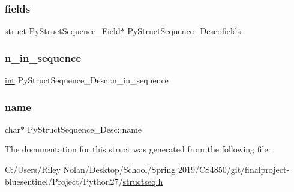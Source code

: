 \subsubsection{\texorpdfstring{fields}{fields}}
{\footnotesize\ttfamily struct \mbox{\hyperlink{struct_py_struct_sequence___field}{Py\+Struct\+Sequence\+\_\+\+Field}}$\ast$ Py\+Struct\+Sequence\+\_\+\+Desc\+::fields}

\mbox{\label{struct_py_struct_sequence___desc_a8a294c7934e6ac8ee4ad5cf0d1496d28}} 
\subsubsection{\texorpdfstring{n\_in\_sequence}{n\_in\_sequence}}
{\footnotesize\ttfamily \mbox{\hyperlink{warnings_8h_a74f207b5aa4ba51c3a2ad59b219a423b}{int}} Py\+Struct\+Sequence\+\_\+\+Desc\+::n\+\_\+in\+\_\+sequence}

\mbox{\label{struct_py_struct_sequence___desc_ae3d6a21652f0c9e62670e79ddad60045}} 
\subsubsection{\texorpdfstring{name}{name}}
{\footnotesize\ttfamily char$\ast$ Py\+Struct\+Sequence\+\_\+\+Desc\+::name}



The documentation for this struct was generated from the following file\+:\begin{DoxyCompactItemize}
\item 
C\+:/\+Users/\+Riley Nolan/\+Desktop/\+School/\+Spring 2019/\+C\+S4850/git/finalproject-\/bluesentinel/\+Project/\+Python27/\mbox{\hyperlink{structseq_8h}{structseq.\+h}}\end{DoxyCompactItemize}
